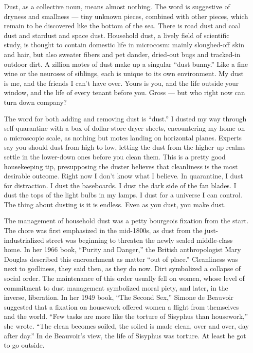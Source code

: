 Dust, as a collective noun, means almost nothing. The word is suggestive
of dryness and smallness --- tiny unknown pieces, combined with other
pieces, which remain to be discovered like the bottom of the sea. There
is road dust and coal dust and stardust and space dust. Household dust,
a lively field of scientific study, is thought to contain domestic life
in microcosm: mainly sloughed-off skin and hair, but also sweater fibers
and pet dander, dried-out bugs and tracked-in outdoor dirt. A zillion
motes of dust make up a singular ``dust bunny.'' Like a fine wine or the
neuroses of siblings, each is unique to its own environment. My dust is
me, and the friends I can't have over. Yours is you, and the life
outside your window, and the life of every tenant before you. Gross ---
but who right now can turn down company?

The word for both adding and removing dust is ``dust.'' I dusted my way
through self-quarantine with a box of dollar-store dryer sheets,
encountering my home on a microscopic scale, as nothing but motes
landing on horizontal planes. Experts say you should dust from high to
low, letting the dust from the higher-up realms settle in the lower-down
ones before you clean them. This is a pretty good housekeeping tip,
presupposing the duster believes that cleanliness is the most desirable
outcome. Right now I don't know what I believe. In quarantine, I dust
for distraction. I dust the baseboards. I dust the dark side of the fan
blades. I dust the tops of the light bulbs in my lamps. I dust for a
universe I can control. The thing about dusting is it is endless. Even
as you dust, you make dust.

The management of household dust was a petty bourgeois fixation from the
start. The chore was first emphasized in the mid-1800s, as dust from the
just-industrialized street was beginning to threaten the newly sealed
middle-class home. In her 1966 book, ``Purity and Danger,'' the British
anthropologist Mary Douglas described this encroachment as matter ``out
of place.'' Cleanliness was next to godliness, they said then, as they
do now. Dirt symbolized a collapse of social order. The maintenance of
this order usually fell on women, whose level of commitment to dust
management symbolized moral piety, and later, in the inverse,
liberation. In her 1949 book, ``The Second Sex,'' Simone de Beauvoir
suggested that a fixation on housework offered women a flight from
themselves and the world. ``Few tasks are more like the torture of
Sisyphus than housework,'' she wrote. ``The clean becomes soiled, the
soiled is made clean, over and over, day after day.'' In de Beauvoir's
view, the life of Sisyphus was torture. At least he got to go outside.

